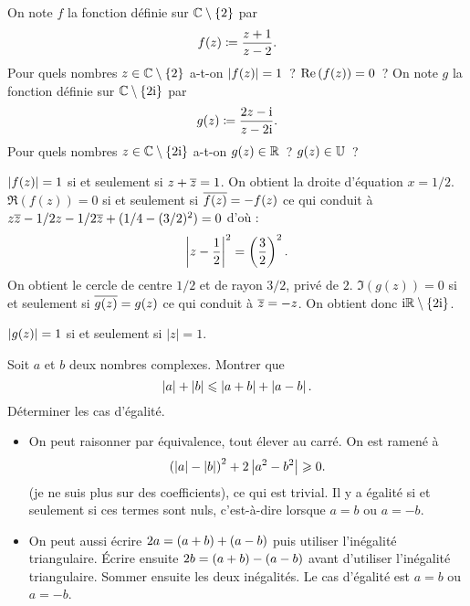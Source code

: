\documentclass{magnolia}
\begin{document}

\begin{questions}
\question On note $f$ la fonction définie sur $\mathbb{C}\setminus\left\{2\right\}$ par
  \[f(z)\coloneqq\frac{z+1}{z-2}.\]
  Pour quels nombres $z\in\mathbb{C}\setminus\left\{2\right\}$ a-t-on $\left|f(z)\right|=1$~? $\mathop{\rm Re}\left(f(z)\right)=0$~?
\question On note $g$ la fonction définie sur $\mathbb{C}\setminus\left\{2{\rm i}\right\}$ par
  \[g(z)\coloneqq\frac{2z-{\rm i}}{z-2{\rm i}}.\]
  Pour quels nombres $z\in\mathbb{C}\setminus\left\{2{\rm i}\right\}$ a-t-on $g(z)\in\mathbb{R}$~? $g(z)\in\U$~?
\end{questions}
\begin{sol}
\begin{questions}
\question $\left|f(z)\right|=1$ si et seulement si $z+\overline{z}=1$. On obtient la droite d'équation $x=1/2$.\\
$\Re(f(z))=0$ si et seulement si $\overline{f(z)}=-f(z)$ ce qui conduit à $z\overline{z}-1/2z-1/2\overline{z}+(1/4-(3/2)^2)=0$ d'où :
\[\left|z-\frac{1}{2}\right|^2=\left(\frac{3}{2}\right)^2.\]
On obtient le cercle de centre $1/2$ et de rayon $3/2$, privé de $2$.
\question  $\Im(g(z))=0$ si et seulement si $\overline{g(z)}=g(z)$ ce qui conduit à $\overline{z}=-z$. On obtient donc ${\rm i}\mathbb{R}\setminus\left\{2{\rm i}\right\}$.

$\left|g(z)\right|=1$ si et seulement si $|z|=1$.

\end{questions}
\end{sol}


Soit $a$ et $b$ deux nombres complexes. Montrer que
\[\left|a\right|+\left|b\right|\leqslant\left|a+b\right|+\left|a-b\right|.\]
Déterminer les cas d'égalité.
\begin{sol}
\begin{itemize}
\item On peut raisonner par équivalence, tout élever au carré. On est ramené à
\[\left(\left|a\right|-\left|b\right|\right)^2+2\left|a^2-b^2\right| \geqslant 0.\]
(je ne suis plus sur des coefficients), ce qui est trivial. Il y a égalité si et seulement si ces termes sont nuls, c'est-à-dire lorsque $a=b$ ou $a=-b$.
\item On peut aussi écrire $2a=\left(a+b\right)+\left(a-b\right)$ puis utiliser l'inégalité triangulaire.
Écrire ensuite $2b=\left(a+b\right)-\left(a-b\right)$ avant d'utiliser l'inégalité
triangulaire. Sommer ensuite les deux inégalités. Le cas d'égalité est
$a=b$ ou $a=-b$.
\end{itemize}
\end{sol}
\end{document}
